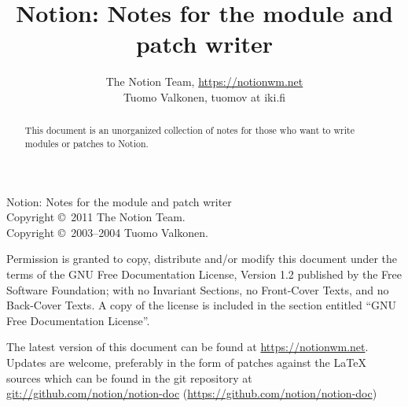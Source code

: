 \documentclass[english,a4paper,11pt,oldtoc,mctitle]{artikel3}
\title{Notion: Notes for the module and patch writer}
\author{The Notion Team, \url{https://notionwm.net} \\ 
	Tuomo Valkonen, tuomov at iki.fi}
\begin{document}
\maketitle

Notion: Notes for the module and patch writer\\
Copyright \copyright\  2011 The Notion Team.\\
Copyright \copyright\  2003--2004 Tuomo Valkonen.

Permission is granted to copy, distribute and/or modify this document
under the terms of the GNU Free Documentation License, Version 1.2
published by the Free Software Foundation;
with no Invariant Sections, no Front-Cover Texts, and no Back-Cover Texts.
A copy of the license is included in the section entitled ``GNU
Free Documentation License''.

The latest version of this document can be found at 
\url{https://notionwm.net}. Updates are
welcome, preferably in the form of patches against the \LaTeX{} sources which
can be found in the git repository at 
\url{git://github.com/notion/notion-doc} 
(\url{https://github.com/notion/notion-doc})

\bigskip

\begin{abstract}
    This document is an unorganized collection of notes for
    those who want to write modules or patches to Notion.
\end{abstract}

\tableofcontents













\appendix





\printindex
\end{document}
